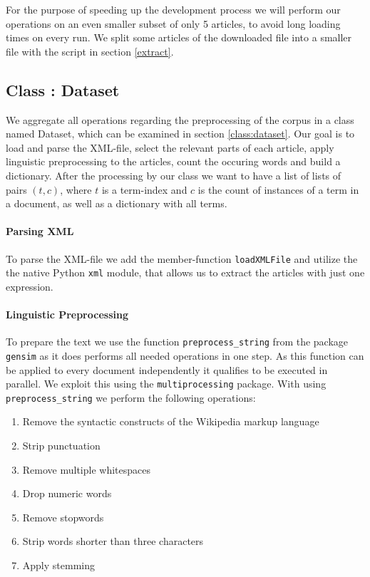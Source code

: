 \documentclass[12 pt,twopage]{article}
\begin{document}
For the purpose of speeding up the development process we will perform our operations on an even smaller subset of only 5 articles, to avoid long loading times on every run. We split some articles of the downloaded file into a smaller file with the script in section \ref{extract}.

\subsection{Class : Dataset}
We aggregate all operations regarding the preprocessing of the corpus in a class named Dataset, which can be examined in section  \ref{class:dataset}. Our goal is to load and parse the XML-file, select the relevant parts of each article, apply linguistic preprocessing to the articles, count the occuring words and build a dictionary. After the processing by our class we want to have a list of lists of pairs \((t,c)\), where \(t\) is a term-index and \(c\) is the count of instances of a term in a document, as well as a dictionary with all terms.


\paragraph{Parsing XML}  To parse the XML-file we add the member-function \texttt{loadXMLFile} and utilize the the native Python \texttt{xml} module, that allows us to extract the articles with just one expression.
\paragraph{Linguistic Preprocessing} To prepare the text we use the function \texttt{preprocess\_string} from the package \texttt{gensim} as it does performs all needed operations in one step. As this function can be applied to every document independently it qualifies to be executed in parallel. We exploit this using the \texttt{multiprocessing} package.
With using \texttt{preprocess\_string} we perform the following operations:

\begin{enumerate}
 \item Remove the syntactic constructs of the Wikipedia markup language
 \item Strip punctuation
 \item Remove multiple whitespaces
 \item Drop numeric words
 \item Remove stopwords
 \item Strip words shorter than three characters
 \item Apply stemming
\end{enumerate}
\end{document}
